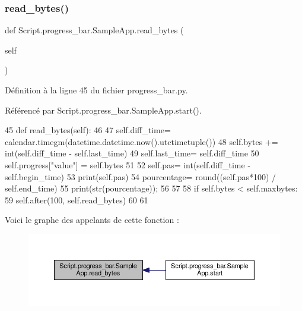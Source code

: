 \subsubsection{\texorpdfstring{read\+\_\+bytes()}{read\_bytes()}}
{\footnotesize\ttfamily def Script.\+progress\+\_\+bar.\+Sample\+App.\+read\+\_\+bytes (\begin{DoxyParamCaption}\item[{}]{self }\end{DoxyParamCaption})}



Définition à la ligne 45 du fichier progress\+\_\+bar.\+py.



Référencé par Script.\+progress\+\_\+bar.\+Sample\+App.\+start().


\begin{DoxyCode}
45     \textcolor{keyword}{def }read\_bytes(self):
46 
47         self.diff\_time= calendar.timegm(datetime.datetime.now().utctimetuple())
48         self.bytes += int(self.diff\_time - self.last\_time)
49         self.last\_time= self.diff\_time
50         self.progress[\textcolor{stringliteral}{"value"}] = self.bytes
51 
52         self.pas= int(self.diff\_time - self.begin\_time)
53         print(self.pas)
54         pourcentage= round((self.pas*100) / self.end\_time)
55         print(str(pourcentage));
56 
57         
58         \textcolor{keywordflow}{if} self.bytes < self.maxbytes:
59             self.after(100, self.read\_bytes)
60 
61 
\end{DoxyCode}
Voici le graphe des appelants de cette fonction \+:\nopagebreak
\begin{figure}[H]
\begin{center}
\leavevmode
\includegraphics[width=350pt]{classScript_1_1progress__bar_1_1SampleApp_ac84a187555b70009960d8205c352a6c7_icgraph}
\end{center}
\end{figure}
\mbox{\label{classScript_1_1progress__bar_1_1SampleApp_a9c3207958e5b061a0c5c43d986ccb17b}} 
